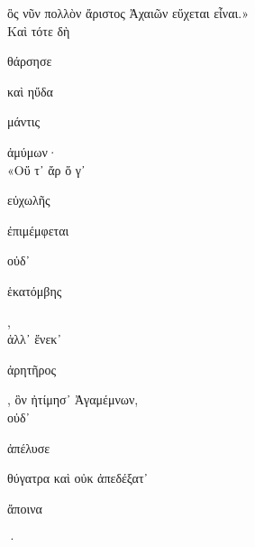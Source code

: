 \documentclass{ransom}
\begin{document}
\begin{foreignpage}
\begin{graytext}
ὃς νῦν πολλὸν ἄριστος Ἀχαιῶν εὔχεται εἶναι.»\\
Καὶ τότε δὴ \begin{whitetext}θάρσησε\end{whitetext} καὶ ηὔδα \begin{whitetext}μάντις\end{whitetext} ἀμύμων·\\
«Οὔ τ᾽ ἄρ ὅ γ᾽ \begin{whitetext}εὐχωλῆς\end{whitetext} \begin{whitetext}ἐπιμέμφεται\end{whitetext} οὐδ᾽ \begin{whitetext}ἑκατόμβης\end{whitetext},\\
ἀλλ᾽ ἕνεκ᾽ \begin{whitetext}ἀρητῆρος\end{whitetext}, ὃν ἠτίμησ᾽ Ἀγαμέμνων,\\
οὐδ᾽ \begin{whitetext}ἀπέλυσε\end{whitetext} θύγατρα καὶ οὐκ ἀπεδέξατ᾽ \begin{whitetext}ἄποινα\end{whitetext}·\hfill{}\\

\end{graytext}


\end{foreignpage}
\end{document}
